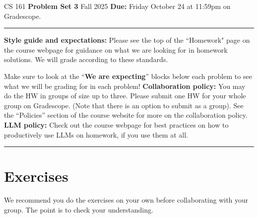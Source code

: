 \documentclass[11pt]{article}
\begin{document}
\noindent
CS 161 \hfill \textbf{Problem Set 3} \newline 
{Fall 2025} \hfill \textbf{Due:} Friday October 24 at 11:59pm on Gradescope.

\noindent
\rule{\linewidth}{0.4pt}

\noindent
\textbf{Style guide and expectations:} Please see the top of the ``Homework" page on the course webpage for guidance on what we are looking for in homework solutions.  We will grade according to these standards.

Make sure to look at the ``\textbf{We are expecting}'' blocks below each problem to see what we will be grading for in each problem!
\newline\newline
\textbf{Collaboration policy:} You may do the HW in groups of size up to three.  Please submit one HW for your whole group on Gradescope.  (Note that there is an option to submit as a group).  See the ``Policies'' section of the course website for more on the collaboration policy.
\noindent
\newline\newline
\textbf{LLM policy:} Check out the course webpage for best practices on how to productively use LLMs on homework, if you use them at all.   \newline\noindent
\rule{\linewidth}{0.4pt}

\section*{Exercises}
We recommend you do the exercises on your own before collaborating with your group.  The point is to check your understanding.
\end{document}
